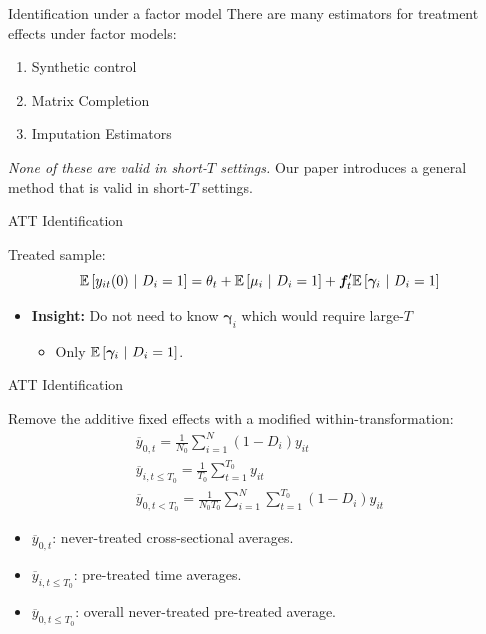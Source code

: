 \documentclass[aspectratio=43,t]{beamer}
\begin{document}
\begin{frame}{Identification under a factor model}
    There are many estimators for treatment effects under factor models:
    \begin{enumerate}
        \item Synthetic control \begin{citecolor}\citep{Abadie_2021}\end{citecolor}
        \item Matrix Completion \begin{citecolor}\citep{Athey_et_al_2021}\end{citecolor}
        \item Imputation Estimators \begin{citecolor}\citep{Gobillon_Magnac_2016, Xu_2017}\end{citecolor}
    \end{enumerate}

    \bigskip
    \emph{None of these are valid in short-$T$ settings.} Our paper introduces a general method that is valid in short-$T$ settings.
\end{frame}

\begin{frame}{ATT Identification}

Treated sample:
\begin{equation}
    \mathbb{E}\left[y_{it}(0) \ \vert \ D_i = 1\right] = \theta_t + \mathbb{E}\left[\mu_i \ \vert \ D_i = 1\right] + \bm f_t' \mathbb{E}\left[\bm \gamma_i \ \vert \ D_i = 1\right]
\end{equation}
\begin{itemize} 
    \item \textbf{Insight:} Do not need to know $\bm \gamma_i$ which would require large-$T$
    \begin{itemize}
        \item Only $\mathbb{E}\left[\bm \gamma_i \ \vert \ D_i = 1\right]$.
    \end{itemize}
\end{itemize}
    
\end{frame}

\begin{frame}{ATT Identification}

Remove the additive fixed effects with a modified within-transformation:
\begin{gather*}
    \overline{y}_{0 , t} = \frac{1}{N_{0}} \sum_{i = 1}^N (1 - D_i) y_{it} \\
    \overline{y}_{i,t\leq T_0} = \frac{1}{T_0} \sum_{t = 1}^{T_0} y_{it} \\
    \overline{y}_{0, t < T_0} = \frac{1}{N_{0} T_0} \sum_{i = 1}^N \sum_{t = 1}^{T_0} (1 - D_i) y_{it}
\end{gather*}


\begin{itemize}
    \item $\overline{y}_{0,t}$: never-treated cross-sectional averages.
    \item $\overline{y}_{i,t \leq T_0}$: pre-treated time averages.
    \item $\overline{y}_{0, t \leq T_0}$: overall never-treated pre-treated average. 
\end{itemize}
\end{frame}
\end{document}

